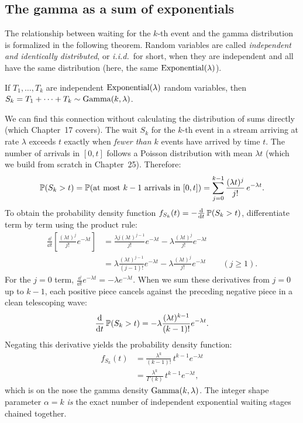 \subsection{The gamma as a sum of exponentials}
The relationship between waiting for the $k$-th event and the gamma distribution is formalized in the following theorem.
Random variables are called \emph{independent and identically distributed}, or \emph{i.i.d.}\ for short, when they are independent and all have the same distribution (here, the same $\Expo(\lambda)$).
\begin{theorem}
\label{ch11:thm-sum-expo}
If $T_1,\dots,T_k$ are independent $\Expo(\lambda)$ random variables, then
$S_k = T_1 + \cdots + T_k \sim \Gam(k,\lambda)$.
\end{theorem}
\begin{whybox}
We can find this connection without calculating the distribution of sums directly (which Chapter~17 covers). The wait $S_k$ for the $k$-th event in a stream
arriving at rate $\lambda$ exceeds $t$ exactly when \emph{fewer than $k$} events
have arrived by time $t$. The number of arrivals in $[0,t]$ follows a Poisson distribution with mean
$\lambda t$ (which we build from scratch in Chapter~25). Therefore:
\[
  \P(S_k > t) = \P(\text{at most } k-1 \text{ arrivals in } [0,t])
              = \sum_{j=0}^{k-1} \frac{(\lambda t)^j}{j!}\,e^{-\lambda t}.
\]
To obtain the probability density function $f_{S_k}(t) = -\frac{\dd}{\dd t}\P(S_k > t)$, differentiate term by term using the product rule:
\begin{align*}
  \frac{\dd}{\dd t}\left[\frac{(\lambda t)^j}{j!} e^{-\lambda t}\right]
  &= \frac{\lambda j (\lambda t)^{j-1}}{j!} e^{-\lambda t} - \lambda \frac{(\lambda t)^j}{j!} e^{-\lambda t} \\
  &= \lambda \frac{(\lambda t)^{j-1}}{(j-1)!} e^{-\lambda t} - \lambda \frac{(\lambda t)^j}{j!} e^{-\lambda t} \qquad (j \ge 1).
\end{align*}
For the $j=0$ term, $\frac{\dd}{\dd t} e^{-\lambda t} = -\lambda e^{-\lambda t}$.
When we sum these derivatives from $j=0$ up to $k-1$, each positive piece cancels against the preceding negative piece in a clean telescoping wave:
\[
  \frac{\dd}{\dd t}\P(S_k > t) = -\lambda \frac{(\lambda t)^{k-1}}{(k-1)!} e^{-\lambda t}.
\]
Negating this derivative yields the probability density function:
\begin{align*}
  f_{S_k}(t) &= \frac{\lambda^{k}}{(k-1)!}\,t^{k-1} e^{-\lambda t} \\
             &= \frac{\lambda^{k}}{\Gamma(k)}\,t^{k-1} e^{-\lambda t},
\end{align*}
which is on the nose the gamma density $\Gam(k,\lambda)$. The integer shape parameter $\alpha = k$ \emph{is} the exact number of independent exponential waiting stages chained together.
\end{whybox}

